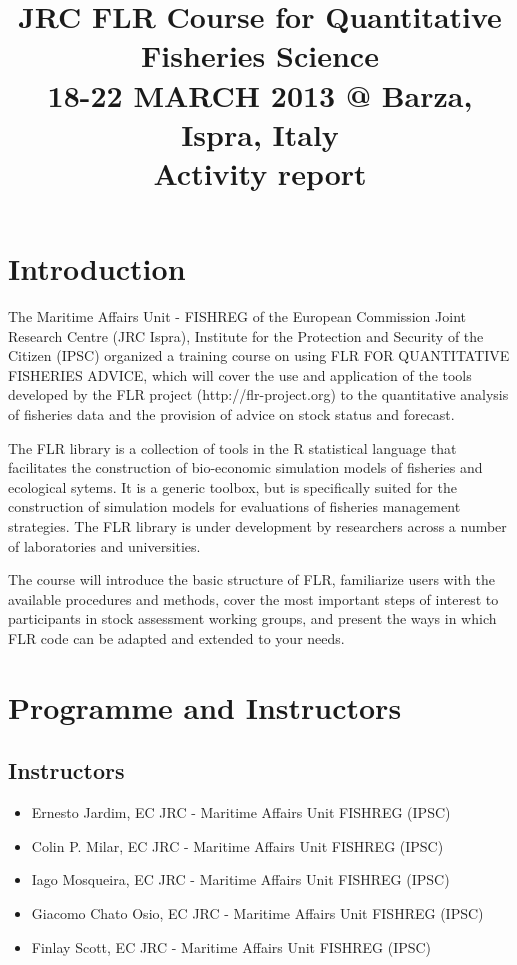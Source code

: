 \documentclass[a4paper]{article}
\begin{document}
\title{JRC FLR Course for Quantitative Fisheries Science \\ 18-22 MARCH 2013 @ Barza, Ispra, Italy \\ Activity report}
\maketitle

\section{Introduction}

The Maritime Affairs Unit - FISHREG of the European Commission Joint Research Centre (JRC Ispra), Institute for the Protection and Security of the Citizen (IPSC) organized a training course on using FLR FOR QUANTITATIVE FISHERIES ADVICE, which will cover the use and application of the tools developed by the FLR project (http://flr-project.org) to the quantitative analysis of fisheries data and the provision of advice on stock status and forecast.

The FLR library is a collection of tools in the R statistical language that facilitates the construction of bio-economic simulation models of fisheries and ecological sytems. It is a generic toolbox, but is specifically suited for the construction of simulation models for evaluations of fisheries management strategies. The FLR library is under development by researchers across a number of laboratories and universities.

The course will introduce the basic structure of FLR, familiarize users with the available procedures and methods, cover the most important steps of interest to participants in stock assessment working groups, and present the ways in which FLR code can be adapted and extended to your needs.

\section{Programme and Instructors}

\subsection*{Instructors}

\begin{itemize}
	\item Ernesto Jardim, EC JRC - Maritime Affairs Unit FISHREG (IPSC)
	\item Colin P. Milar, EC JRC - Maritime Affairs Unit FISHREG (IPSC)
	\item Iago Mosqueira, EC JRC - Maritime Affairs Unit FISHREG (IPSC)
	\item Giacomo Chato Osio, EC JRC - Maritime Affairs Unit FISHREG (IPSC)
	\item Finlay Scott, EC JRC - Maritime Affairs Unit FISHREG (IPSC)
\end{itemize}
\end{document}
